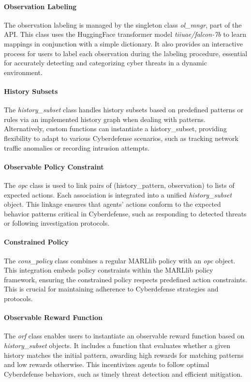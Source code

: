\documentclass[conference]{IEEEtran}
\begin{document}
\paragraph{Observation Labeling}
The observation labeling is managed by the singleton class \textit{ol\_mngr}, part of the API. This class uses the HuggingFace transformer model \textit{tiiuae/falcon-7b} to learn mappings in conjunction with a simple dictionary. It also provides an interactive process for users to label each observation during the labeling procedure, essential for accurately detecting and categorizing cyber threats in a dynamic environment.

\paragraph{History Subsets}
The \textit{history\_subset} class handles history subsets based on predefined patterns or rules via an implemented history graph when dealing with patterns. Alternatively, custom functions can instantiate a history\_subset, providing flexibility to adapt to various Cyberdefense scenarios, such as tracking network traffic anomalies or recording intrusion attempts.

\paragraph{Observable Policy Constraint}
The \textit{opc} class is used to link pairs of (history\_pattern, observation) to lists of expected actions. Each association is integrated into a unified \textit{history\_subset} object. This linkage ensures that agents' actions conform to the expected behavior patterns critical in Cyberdefense, such as responding to detected threats or following investigation protocols.

\paragraph{Constrained Policy}
The \textit{cons\_policy} class combines a regular MARLlib policy with an \textit{opc} object. This integration embeds policy constraints within the MARLlib policy framework, ensuring the constrained policy respects predefined action constraints. This is crucial for maintaining adherence to Cyberdefense strategies and protocols.

\paragraph{Observable Reward Function}
The \textit{orf} class enables users to instantiate an observable reward function based on \textit{history\_subset} objects. It includes a function that evaluates whether a given history matches the initial pattern, awarding high rewards for matching patterns and low rewards otherwise. This incentivizes agents to follow optimal Cyberdefense behaviors, such as timely threat detection and efficient mitigation.
\end{document}

